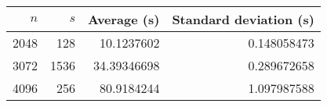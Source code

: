 \begin{tabular}{rrrr}
$n$ & $s$ & Average (s) & Standard deviation (s)\\\hline
2048 & 128 & 10.1237602 & 0.148058473\\
3072 & 1536 & 34.39346698 & 0.289672658\\
4096 & 256 & 80.9184244 & 1.097987588\\
\end{tabular}
